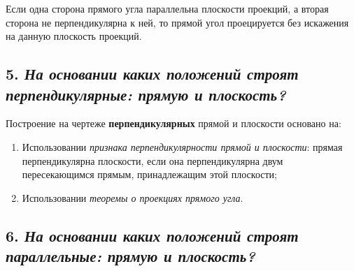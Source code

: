 \begin{mainQuote}
\end{mainQuote}

Если одна сторона прямого угла параллельна плоскости проекций, а вторая сторона не перпендикулярна к ней, то прямой угол проецируется без искажения на данную плоскость проекций.



\newpage
\subsection*{5. \textit{На основании каких положений строят перпендикулярные: прямую и плоскость?}}

\begin{mainQuote}
    
\end{mainQuote}

Построение на чертеже {\bf перпендикулярных} прямой и плоскости основано на:

\begin{enumerate}
    \item Использовании \textit {признака перпендикулярности прямой и плоскости}: прямая перпендикулярна плоскости, если она перпендикулярна двум пересекающимся прямым, принадлежащим этой плоскости;
    \item Использовании \textit {теоремы о проекциях прямого угла}.
\end{enumerate}



\newpage
\subsection*{6. \textit{На основании каких положений строят параллельные: прямую и плоскость?}}

\begin{mainQuote}
    
\end{mainQuote}

